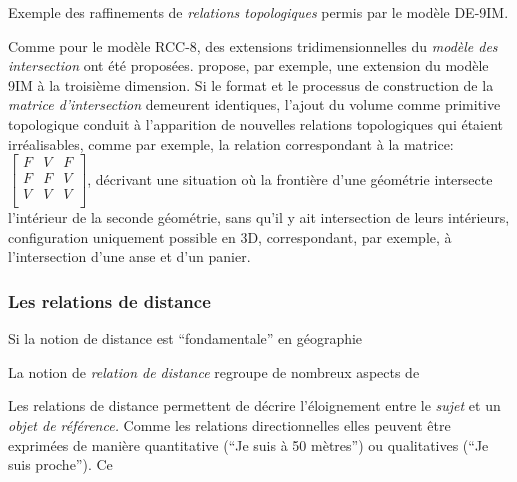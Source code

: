 \begin{table}
  \centering
  
  \caption{Exemple des raffinements de \emph{relations topologiques}
    permis par le modèle DE-9IM.}
  \label{tab:9IM_vs_DE9IM}
\end{table}

Comme pour le modèle RCC-8, des extensions tridimensionnelles du
\emph{modèle des intersection} ont été
proposées. \textcite{DelaLosa2000} propose, par exemple, une extension
du modèle 9IM à la troisième dimension. Si le format et le processus
de construction de la \emph{matrice d'intersection} demeurent
identiques, l'ajout du volume comme primitive topologique conduit à
l'apparition de nouvelles relations topologiques qui étaient
irréalisables, comme par exemple, la relation correspondant à la
matrice: 
%
\(\left[
  \begin{smallmatrix}
    F&V&F\\
    F&F&V\\
    V&V&V\\
  \end{smallmatrix}
\right]\),
%
décrivant une situation où la frontière d'une géométrie intersecte
l'intérieur de la seconde géométrie, sans qu'il y ait intersection de
leurs intérieurs, configuration uniquement possible en 3D,
correspondant, par exemple, à l'intersection d'une anse et d'un
panier.

\subsubsection{Les relations de distance}

Si la notion de distance est \enquote{fondamentale} en géographie
\autocite{Pumain1997}

La notion de \emph{relation de distance} regroupe de nombreux aspects
de  

Les relations de distance permettent de décrire l'éloignement entre le
\emph{sujet} et un \emph{objet de référence.} Comme les relations
directionnelles elles peuvent être exprimées de manière quantitative
(\eg \enquote{Je suis à 50 mètres}) ou qualitatives (\eg \enquote{Je
  suis proche}). Ce




